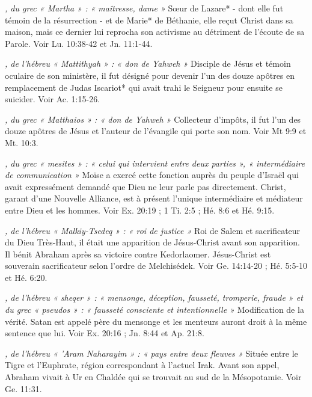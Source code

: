 \begin{multicols}{2}
\textit{, du grec « Martha » : « maîtresse, dame »}\newline
Sœur de Lazare* - dont elle fut témoin de la résurrection - et de Marie* de Béthanie, elle reçut Christ dans sa maison, mais ce dernier lui reprocha son activisme au détriment de l'écoute de sa Parole. Voir Lu. 10:38-42 et Jn. 11:1-44.

\textit{, de l'hébreu « Mattithyah » : « don de Yahweh »}\newline
Disciple de Jésus et témoin oculaire de son ministère, il fut désigné pour devenir l'un des douze apôtres en remplacement de Judas Iscariot* qui avait trahi le Seigneur pour ensuite se suicider. Voir Ac. 1:15-26.

\textit{, du grec « Matthaios » : « don de Yahweh »}\newline
Collecteur d'impôts, il fut l'un des douze apôtres de Jésus et l'auteur de l'évangile qui porte son nom. Voir Mt 9:9 et Mt. 10:3.

\textit{, du grec « mesites » : « celui qui intervient entre deux parties », « intermédiaire de communication »}\newline
Moïse a exercé cette fonction auprès du peuple d'Israël qui avait expressément demandé que Dieu ne leur parle pas directement. Christ, garant d'une Nouvelle Alliance, est à présent l'unique intermédiaire et médiateur entre Dieu et les hommes. Voir Ex. 20:19 ; 1 Ti. 2:5 ; Hé. 8:6 et Hé. 9:15.

\textit{, de l'hébreu « Malkiy-Tsedeq » : « roi de justice »}\newline
Roi de Salem et sacrificateur du Dieu Très-Haut, il était une apparition de Jésus-Christ avant son apparition. Il bénit Abraham après sa victoire contre Kedorlaomer. Jésus-Christ est souverain sacrificateur selon l'ordre de Melchisédek. Voir Ge. 14:14-20 ; Hé. 5:5-10 et Hé. 6:20.

\textit{, de l'hébreu « sheqer » : « mensonge, déception, fausseté, tromperie, fraude » et du grec « pseudos » : « fausseté consciente et intentionnelle »}\newline
Modification de la vérité. Satan est appelé père du mensonge et les menteurs auront droit à la même sentence que lui. Voir Ex. 20:16 ; Jn. 8:44 et Ap. 21:8.

\textit{, de l'hébreu « 'Aram Naharayim » : « pays entre deux fleuves »}\newline
Située entre le Tigre et l'Euphrate, région correspondant à l'actuel Irak. Avant son appel, Abraham vivait à Ur en Chaldée qui se trouvait au sud de la Mésopotamie. Voir Ge. 11:31.


\end{multicols}
